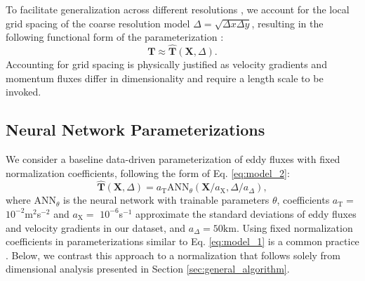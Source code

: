 \documentclass[draft]{agujournal2019}
\begin{document}
To facilitate generalization across different resolutions \cite<scale-aware or grid-aware parameterization,>{bachman2017scale}, we account for the local grid spacing of the coarse resolution model $\Delta = \sqrt{\Delta x \Delta y}$, resulting in the following functional form of the parameterization \cite{lund1993parameterization, li2025transformer}:
\begin{equation}
    \mathbf{T} \approx \widehat{\mathbf{T}}(\mathbf{X}, \Delta). \label{eq:model_2}
\end{equation}
Accounting for grid spacing is physically justified as velocity gradients and momentum fluxes differ in dimensionality and require a length scale to be invoked.

%

\subsection{Neural Network Parameterizations} \label{sec: eddy_param}

We consider a baseline data-driven parameterization of eddy fluxes with fixed normalization coefficients, following the form of Eq. \eqref{eq:model_2}:
\begin{equation}
\widehat{\mathbf{T}}(\mathbf{X}, \Delta) = a_{\mathrm{T}} \mathrm{ANN}_{\theta}(\mathbf{X} / a_{\mathrm{X}}, \Delta / a_{\Delta}), \label{eq:model_1}
\end{equation}
where $\mathrm{ANN}_{\theta}$ is the neural network with trainable parameters $\theta$, coefficients $a_{\mathrm{T}}=$$10^{-2}$m$^2$s$^{-2}$ and $a_{\mathrm{X}}=$ $10^{-6}$s$^{-1}$ approximate the standard deviations of eddy fluxes and velocity gradients in our dataset, and $a_{\Delta}=50 \mathrm{km}$.
Using fixed normalization coefficients in parameterizations similar to Eq. \eqref{eq:model_1} is a common practice \cite{srinivasan2024turbulence}. Below, we contrast this approach to a normalization that follows solely from dimensional analysis presented in Section \ref{sec:general_algorithm}.

\end{document}
